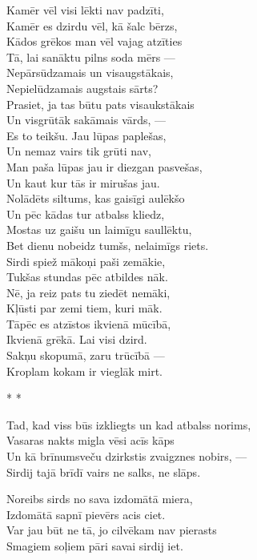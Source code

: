 \documentclass[14pt]{extarticle}
\begin{document}
Kamēr vēl visi lēkti nav padzīti,\\
Kamēr es dzirdu vēl, kā šalc bērzs,\\
Kādos grēkos man vēl vajag atzīties\\
Tā, lai sanāktu pilns soda mērs ---\\
Nepārsūdzamais un visaugstākais,\\
Nepielūdzamais augstais sārts?\\
Prasiet, ja tas būtu pats visaukstākais\\
Un visgrūtāk sakāmais vārds, ---\\
Es to teikšu. Jau lūpas paplešas,\\
Un nemaz vairs tik grūti nav,\\
Man paša lūpas jau ir diezgan pasvešas,\\
Un kaut kur tās ir mirušas jau.\\
Nolādēts siltums, kas gaisīgi aulēkšo\\
Un pēc kādas tur atbalss kliedz,\\
Mostas uz gaišu un laimīgu saullēktu,\\
Bet dienu nobeidz tumšs, nelaimīgs riets.\\
Sirdi spiež mākoņi paši zemākie,\\
Tukšas stundas pēc atbildes nāk.\\
Nē, ja reiz pats tu ziedēt nemāki,\\
Kļūsti par zemi tiem, kuri māk.\\
Tāpēc es atzīstos ikvienā mūcībā,\\
Ikvienā grēkā. Lai visi dzird.\\
Sakņu skopumā, zaru trūcībā ---\\
Kroplam kokam ir vieglāk mirt.



\newpage

{\large \sc * * *}

Tad, kad viss būs izkliegts un kad atbalss norims,\\
Vasaras nakts migla vēsi acīs kāps\\
Un kā brīnumsveču dzirkstis zvaigznes nobirs, ---\\
Sirdij tajā brīdī vairs ne salks, ne slāps.

Noreibs sirds no sava izdomātā miera,\\
Izdomātā sapnī pievērs acis ciet.\\
Var jau būt ne tā, jo cilvēkam nav pierasts\\
Smagiem soļiem pāri savai sirdij iet.
\end{document}

